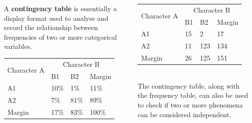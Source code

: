 \begin{frame}
  \vspace{.5cm}
  \begin{columns}
    \begin{column}{0.45\textwidth}
      A \textbf{contingency table} is essentially a display format used to analyse and record the relationship between frequencies of two or more categorical variables.\\
      \vspace{.5cm}
      \begin{tabular}{|l|l|l|l|} 
        \hline
        \multirow{2}{*}{\parbox{1.5cm}{Character A}} & \multicolumn{3}{c|}{Character B}\\
        \cline{2-4}
        &B1&B2& Margin\\
        \hline
        A1 & 10\% & 1\% & 11\%\\
        A2 &  7\% & 81\% &  89\%\\
        \hline
        Margin &  17\% & 83\% & 100\%\\
        \hline
      \end{tabular}
    \end{column} 
    \begin{column}{0.4\textwidth}
      \vspace{.5cm}
      \begin{tabular}{|l|l|l|l|} 
        \hline
        \multirow{2}{*}{\parbox{1.5cm}{Character A}} & \multicolumn{3}{c|}{Character B}\\
        \cline{2-4}
        &B1&B2& Margin\\
        \hline
        A1 & 15 & 2 & 17\\
        A2 &  11 & 123 &  134\\
        \hline
        Margin &  26 & 125 & 151\\
        \hline
      \end{tabular}\\
      \vspace{.5cm}
      The contingency table, along with the frequency  table, can also be used to check if two or more phenomena can be considered independent. 
    \end{column}
  \end{columns} 
\end{frame}

